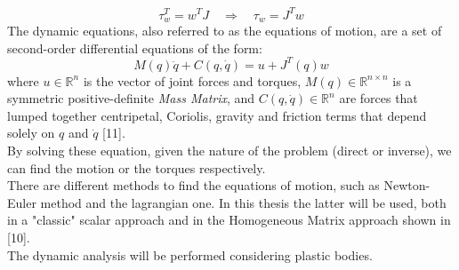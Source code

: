 \documentclass[a4paper,12pt,oneside]{report}
\begin{document}
\begin{equation}
  \tau_w^T=w^TJ \quad \Rightarrow \quad \tau_w=J^Tw
  \label{force_jacobian}
\end{equation}
The dynamic equations, also referred to as the equations of motion, are a set of second-order differential equations of the form:
\begin{equation}
  M(q)\ddot{q}+C(q,\dot{q})=u+J^T(q)w
  \label{equation_motion}
\end{equation}
where $u \in \mathbb{R}^n$ is the vector of joint forces and torques, $M(q) \in \mathbb{R}^{n \times n}$ is a symmetric positive-definite \textit{Mass Matrix}, and $C(q,\dot{q}) \in \mathbb{R}^n$ are forces that lumped together centripetal, Coriolis, gravity and friction terms that depend solely on $q$ and $\dot{q}$ [11].\\
By solving these equation, given the nature of the problem (direct or inverse), we can find the motion or the torques respectively.\\
There are different methods to find the equations of motion, such as Newton-Euler method and the lagrangian one. In this thesis the latter will be used, both in a "classic" scalar approach and in the Homogeneous Matrix approach shown in [10].\\
The dynamic analysis will be performed considering plastic bodies.
\newpage
\end{document}

